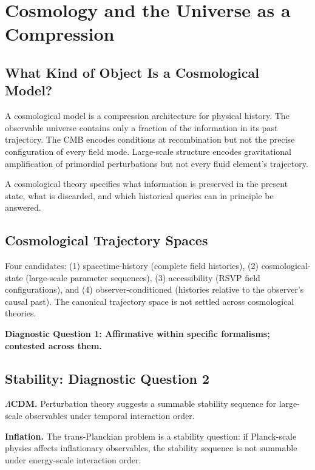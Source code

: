 \chapter{Cosmology and the Universe as a Compression}

\section{What Kind of Object Is a Cosmological Model?}

A cosmological model is a compression architecture for physical history. The observable universe contains only a fraction of the information in its past trajectory. The CMB encodes conditions at recombination but not the precise configuration of every field mode. Large-scale structure encodes gravitational amplification of primordial perturbations but not every fluid element's trajectory.

A cosmological theory specifies what information is preserved in the present state, what is discarded, and which historical queries can in principle be answered.

\section{Cosmological Trajectory Spaces}

Four candidates: (1) spacetime-history (complete field histories), (2) cosmological-state (large-scale parameter sequences), (3) accessibility (RSVP field configurations), and (4) observer-conditioned (histories relative to the observer's causal past). The canonical trajectory space is not settled across cosmological theories.

\textbf{Diagnostic Question 1: Affirmative within specific formalisms; contested across them.}

\section{Stability: Diagnostic Question 2}

\textbf{$\Lambda$CDM.} Perturbation theory suggests a summable stability sequence for large-scale observables under temporal interaction order.

\textbf{Inflation.} The trans-Planckian problem \cite{MartinBrandenberger2001, Baumann2009} is a stability question: if Planck-scale physics affects inflationary observables, the stability sequence is not summable under energy-scale interaction order.


